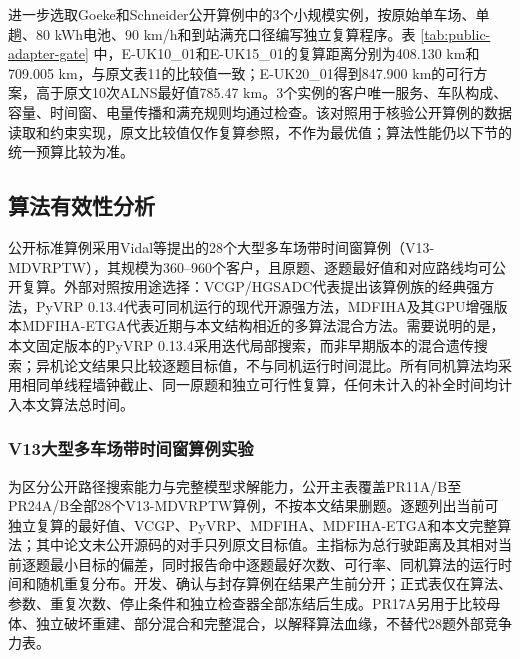\documentclass{setp-new}
\newcommand{\setptabsetup}{\fontsize{9pt}{10.5pt}\selectfont\renewcommand{\arraystretch}{0.90}\setlength{\tabcolsep}{2.2pt}\setlength{\aboverulesep}{0.4pt}\setlength{\belowrulesep}{0.4pt}\hbadness=10000}
\newif\ifETwoPublicReady
\begin{document}
进一步选取Goeke和Schneider公开算例中的3个小规模实例，按原始单车场、单趟、80 kWh电池、90 km/h和到站满充口径编写独立复算程序。表 \ref{tab:public-adapter-gate} 中，E-UK10\_01和E-UK15\_01的复算距离分别为408.130 km和709.005 km，与原文表11的比较值一致；E-UK20\_01得到847.900 km的可行方案，高于原文10次ALNS最好值785.47 km。3个实例的客户唯一服务、车队构成、容量、时间窗、电量传播和满充规则均通过检查。该对照用于核验公开算例的数据读取和约束实现，原文比较值仅作复算参照，不作为最优值；算法性能仍以下节的统一预算比较为准。

\begin{table}[H]
\centering
\caption{公开算例三实例复算结果}
\label{tab:public-adapter-gate}
\setptabsetup

\end{table}

\subsection{算法有效性分析}

公开标准算例采用Vidal等提出的28个大型多车场带时间窗算例（V13-MDVRPTW），其规模为360--960个客户，且原题、逐题最好值和对应路线均可公开复算\cite{ref:74}。外部对照按用途选择：VCGP/HGSADC代表提出该算例族的经典强方法，PyVRP 0.13.4代表可同机运行的现代开源强方法，MDFIHA及其GPU增强版本MDFIHA-ETGA代表近期与本文结构相近的多算法混合方法\cite{ref:64,ref:75}。需要说明的是，本文固定版本的PyVRP 0.13.4采用迭代局部搜索，而非早期版本的混合遗传搜索；异机论文结果只比较逐题目标值，不与同机运行时间混比。所有同机算法均采用相同单线程墙钟截止、同一原题和独立可行性复算，任何未计入的补全时间均计入本文算法总时间。

\ifETwoPublicReady
\subsubsection{V13大型多车场带时间窗算例实验}

为区分公开路径搜索能力与完整模型求解能力，公开主表覆盖PR11A/B至PR24A/B全部28个V13-MDVRPTW算例，不按本文结果删题。逐题列出当前可独立复算的最好值、VCGP、PyVRP、MDFIHA、MDFIHA-ETGA和本文完整算法；其中论文未公开源码的对手只列原文目标值。主指标为总行驶距离及其相对当前逐题最小目标的偏差，同时报告命中逐题最好次数、可行率、同机算法的运行时间和随机重复分布。开发、确认与封存算例在结果产生前分开；正式表仅在算法、参数、重复次数、停止条件和独立检查器全部冻结后生成。PR17A另用于比较母体、独立破坏重建、部分混合和完整混合，以解释算法血缘，不替代28题外部竞争力表。
\end{document}
